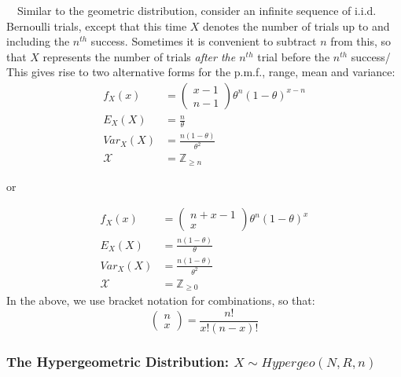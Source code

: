 \documentclass[12pt,a4paper]{article}
\begin{document}
$\quad$Similar to the geometric distribution, consider an infinite sequence of i.i.d. Bernoulli trials, except that this time $X$ denotes the number of trials up to and including the $n^{th}$ success. Sometimes it is convenient to subtract $n$ from this, so that $X$ represents the number of trials \emph{after the $n^{th}$} trial before the $n^{th}$ success/ This gives rise to two alternative forms for the p.m.f., range, mean and variance:
\begin{align*}
f_X(x) &= \left(\!\!\!\begin{array}{c} x-1 \\ n-1 \end{array}\!\!\!\right) \theta^n (1-\theta)^{x-n}\\
E_{X}(X) &= \frac{n}{\theta}\\
Var_{X}(X) &= \frac{n(1-\theta)}{\theta^2}\\
\mathcal{X} &= \mathbb{Z}_{\geq n}
\end{align*}

\begin{center} or \end{center}
\begin{align*}
f_X(x) &= \left(\!\!\!\begin{array}{c} n+x-1 \\ x \end{array}\!\!\!\right) \theta^n (1-\theta)^x\\
E_{X}(X) &= \frac{n(1-\theta)}{\theta}\\
Var _{X}(X) &= \frac{n(1-\theta)}{\theta^2}\\
\mathcal{X} &= \mathbb{Z}_{\geq 0}
\end{align*}
In the above, we use bracket notation for combinations, so that:
$$\left(\!\!\!\begin{array}{c} n\\x\end{array}\!\!\!\right) = \frac{n!}{x! (n-x)!}$$

\subsubsection{The Hypergeometric Distribution: $X \sim Hypergeo(N,R,n)$}
\end{document}
